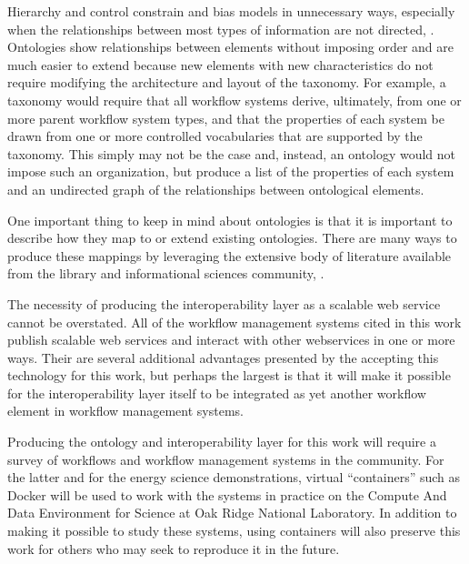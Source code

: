 Hierarchy and control constrain and bias models in unnecessary ways,
especially when the relationships between most types of information are
not directed, \cite{weinberger_everything_2008}. Ontologies show relationships
between elements without imposing order and are much easier to extend
because new elements with new characteristics do not require modifying
the architecture and layout of the taxonomy. For example, a taxonomy
would require that all workflow systems derive, ultimately, from one or
more parent workflow system types, and that the properties of each
system be drawn from one or more controlled vocabularies that are
supported by the taxonomy. This simply may not be the case and, instead,
an ontology would not impose such an organization, but produce a list of
the properties of each system and an undirected graph of the
relationships between ontological elements.

One important thing to keep in mind about ontologies is that it is
important to describe how they map to or extend existing ontologies.
There are many ways to produce these mappings by leveraging the
extensive body of literature available from the library and
informational sciences community, \cite{allemang_semantic_2008}.

The necessity of producing the interoperability layer as a scalable web
service cannot be overstated. All of the workflow management systems
cited in this work publish scalable web services and interact with other
webservices in one or more ways. Their are several additional advantages
presented by the accepting this technology for this work, but perhaps
the largest is that it will make it possible for the interoperability
layer itself to be integrated as yet another workflow element in
workflow management systems.

Producing the ontology and interoperability layer for this work will
require a survey of workflows and workflow management systems in the
community. For the latter and for the energy science demonstrations,
virtual ``containers'' such as Docker will be used to work with the
systems in practice on the Compute And Data Environment for Science at
Oak Ridge National Laboratory. In addition to making it possible to
study these systems, using containers will also preserve this work for
others who may seek to reproduce it in the future.
